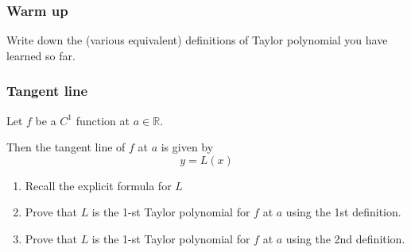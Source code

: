 \documentclass[14pt]{beamer}
\begin{document}





	\begin{frame}[t]
		\frametitle{Warm up}

		Write down the (various equivalent) definitions of Taylor polynomial you
		have learned so far.
	\end{frame}

	\begin{frame}[t]
		\frametitle{Tangent line}

		Let $f$ be a $C^{1}$ function at $a \in \mathbb{R}$.

		Then the tangent line of $f$ at $a$ is given by
		\[
			y = L(x)
		\]
		\begin{enumerate}
			\item Recall the explicit formula for $L$

			\item Prove that $L$ is the 1-st Taylor polynomial for $f$ at $a$ using the
				1st definition.

			\item Prove that $L$ is the 1-st Taylor polynomial for $f$ at $a$ using the
				2nd definition.
		\end{enumerate}
	\end{frame}
\end{document}
